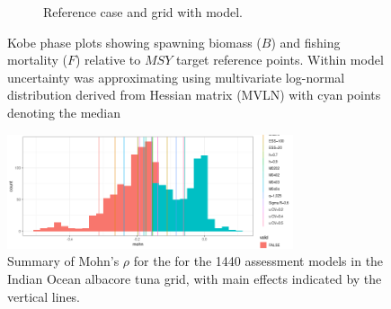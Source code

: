 \begin{figure}
\begin{subfigure}[b]{0.5\textwidth}
                \caption{Reference case and grid with model.}
                \label{fig:kobe-bg}
        \end{subfigure}%
        \caption{Kobe phase plots showing spawning biomass ($B$) and fishing mortality ($F$) relative to $MSY$ target reference points. Within model uncertainty was approximating using multivariate log-normal distribution derived from Hessian matrix (MVLN) with cyan points denoting the median}\label{fig:kobe}
\end{figure}

\clearpage
\newpage
\begin{figure}[ht!]\centering\includegraphics[width=0.75\textwidth]{figures/mohn3-1.png}  \caption{Summary of Mohn's $\rho$ for the for the 1440 assessment models in the Indian Ocean albacore tuna grid, with main effects indicated by the vertical lines.} 
\label{fig:mohn}       
\end{figure}

